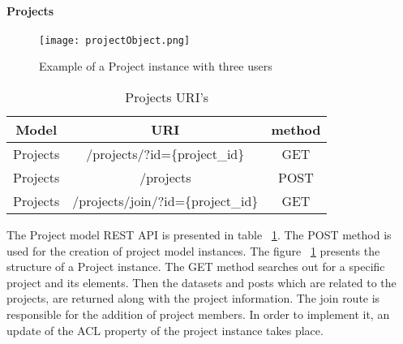 \paragraph{Projects}
\begin{figure}
	\centerline{\texttt{[image: projectObject.png]}}
	\caption{Example of a Project instance with three users}
	\label{projectObject}
\end{figure}
\begin{table}[]
\centering
\begin{tabular}{|c|c|c|}
\hline
\rowcolor[HTML]{32CB00} 
\textbf{Model} & \textbf{URI}                   & \textbf{method} \\ \hline
\rowcolor[HTML]{FFFFFF} 
Projects       & /projects/?id=\{project\_id\}      & GET             \\ \hline
\rowcolor[HTML]{67FD9A} 
Projects       & /projects                      & POST            \\ \hline
\rowcolor[HTML]{FFFFFF} 
Projects       & /projects/join/?id=\{project\_id\} & GET             \\ \hline
\end{tabular}
\caption{Projects URI's}
\label{projectsURI}
\end{table}
The Project model REST API is presented in table ~\ref{projectsURI}. The POST method is used for the creation of project model instances. The  figure ~\ref{projectObject} presents the structure of a Project instance. The GET method searches out for a specific project and its elements. Then the datasets and posts which are related to the projects, are returned along with the project information. The join route is responsible for the addition of project members. In order to implement it, an update of the ACL property of the project instance takes place.

